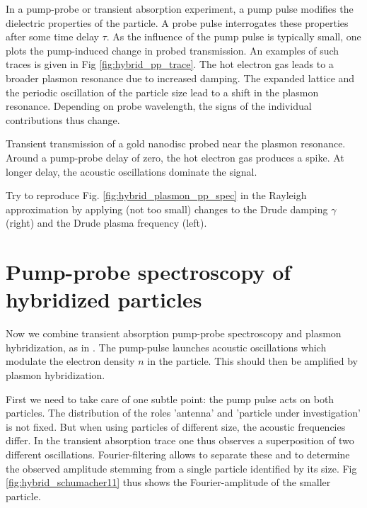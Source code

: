 In a pump-probe or transient absorption experiment, a pump pulse modifies the dielectric properties of
the particle. A probe pulse interrogates these properties after some time delay $\tau$. As the influence of the pump pulse is typically small, one plots the pump-induced change in probed transmission. An examples of such traces is given in Fig \ref{fig:hybrid_pp_trace}.  The hot electron gas leads to a broader plasmon resonance due to increased damping. The expanded lattice and the periodic oscillation of the particle size lead to a shift in the plasmon resonance. Depending  on probe wavelength, the signs of the individual contributions thus change.


\begin{marginfigure}
\caption{Transient transmission of a gold nanodisc probed near the plasmon resonance. Around a pump-probe delay of zero, the hot electron gas produces a spike. At longer delay, the acoustic oscillations dominate the signal. 
\label{fig:hybrid_pp_trace}}
\end{marginfigure}

\begin{questions}
\item Try to reproduce Fig. \ref{fig:hybrid_plasmon_pp_spec} in the Rayleigh approximation by applying (not too small) changes to the Drude damping $\gamma$ (right) and the Drude plasma frequency (left).
\end{questions}


\section{Pump-probe spectroscopy of hybridized particles}


Now we combine transient absorption pump-probe spectroscopy and plasmon hybridization, as in \cite{Schumacher11}. The pump-pulse launches acoustic oscillations which modulate the electron density $n$ in the particle. This  should then be amplified by plasmon hybridization.

First we need to take care of one subtle point: the pump pulse acts on both particles. The distribution of the roles 'antenna' and 'particle under investigation' is not fixed. But when using particles of different size, the acoustic frequencies differ. In the transient absorption trace one thus observes a superposition of two different oscillations. Fourier-filtering allows to separate these and to determine the observed amplitude stemming from a single particle identified by its size. Fig \ref{fig:hybrid_schumacher11} thus shows the Fourier-amplitude of the smaller particle.


